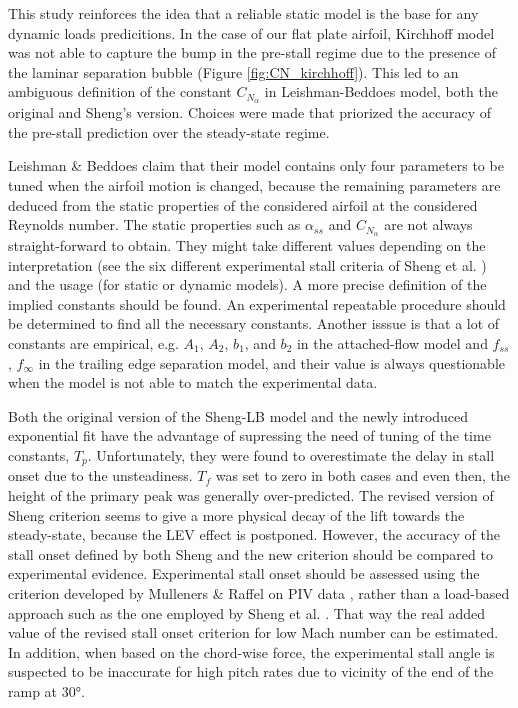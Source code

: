 This study reinforces the idea that a reliable static model is the base for any dynamic loads predicitions. In the case of our flat plate airfoil, Kirchhoff model was not able to capture the bump in the pre-stall regime due to the presence of the laminar separation bubble (Figure \ref{fig:CN_kirchhoff}). This led to an ambiguous definition of the constant $C_{N_\alpha}$ in Leishman-Beddoes model, both the original and Sheng's version. Choices were made that priorized the accuracy of the pre-stall prediction over the steady-state regime. 

Leishman \& Beddoes claim that their model contains only four parameters to be tuned when the airfoil motion is changed, because the remaining parameters are deduced from the static properties of the considered airfoil at the considered Reynolds number. The static properties such as $\alpha_{ss}$ and $C_{N_\alpha}$ are not always straight-forward to obtain. They might take different values depending on the interpretation (see the six different experimental stall criteria of Sheng et al. \cite{sheng_new_2006}) and the usage (for static or dynamic models). 
A more precise definition of the implied constants should be found. An experimental repeatable procedure should be determined to find all the necessary constants. Another isssue is that a lot of constants are empirical, e.g. $A_1$, $A_2$, $b_1$, and $b_2$ in the attached-flow model and $f_{ss}$, $f_\infty$ in the trailing edge separation model, and their value is always questionable when the model is not able to match the experimental data. 

Both the original version of the Sheng-LB model and the newly introduced exponential fit have the advantage of supressing the need of tuning of the time constants, $T_p$. Unfortunately, they were found to overestimate the delay in stall onset due to the unsteadiness. $T_f$ was set to zero in both cases and even then, the height of the primary peak was generally over-predicted. The revised version of Sheng criterion seems to give a more physical decay of the lift towards the steady-state, because the LEV effect is postponed. However, the accuracy of the stall onset defined by both Sheng and the new criterion should be compared to experimental evidence. Experimental stall onset should be assessed using the criterion developed by Mulleners \& Raffel on PIV data \cite{mulleners_onset_2010}, rather than a load-based approach such as the one employed by Sheng et al. \cite{sheng_new_2006}. That way the real added value of the revised stall onset criterion for low Mach number can be estimated. In addition, when based on the chord-wise force, the experimental stall angle is suspected to be inaccurate for high pitch rates due to vicinity of the end of the ramp at $\ang{30}$.